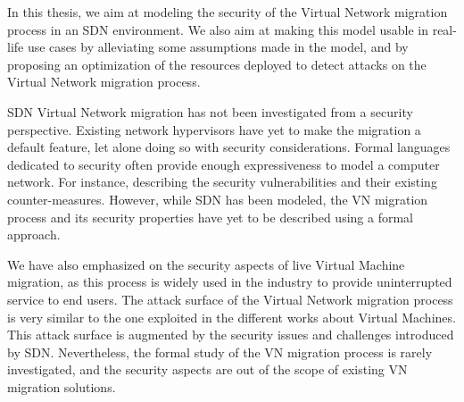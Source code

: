 In this thesis, we aim at modeling the security of the Virtual Network migration process in an SDN environment.
We also aim at making this model usable in real-life use cases by alleviating some assumptions made in the model, and by proposing an optimization of the resources deployed to detect attacks on the Virtual Network migration process.

SDN Virtual Network migration has not been investigated from a security perspective.
Existing network hypervisors have yet to make the migration a default feature, let alone doing so with security considerations.
Formal languages dedicated to security often provide enough expressiveness to model a computer network. 
For instance, describing the security vulnerabilities and their existing counter-measures.
However, while SDN has been modeled, the VN migration process and its security properties have yet to be described using a formal approach.

We have also emphasized on the security aspects of live Virtual Machine migration, as this process is widely used in the industry to provide uninterrupted service to end users. 
The attack surface of the Virtual Network migration process is very similar to the one exploited in the different works about Virtual Machines. This attack surface is augmented by the security issues and challenges introduced by SDN. Nevertheless, the formal study of the VN migration process is rarely investigated, and the security aspects are out of the scope of existing VN migration solutions.


